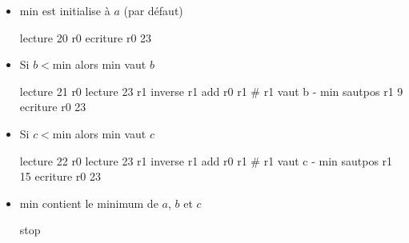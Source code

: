 \begin{enumerate}
\begin{correction}
\begin{itemize}
\begin{listing}{20}
12 # a
23 # b
6  # c
?  # min
\end{listing}
\item $\text{min}$ est initialise à $a$ (par défaut)
\begin{listing}{1}
lecture 20 r0
ecriture r0 23
\end{listing}
\item Si $b < \text{min}$ alors $\text{min}$ vaut $b$
\begin{listing}{3}
lecture 21 r0
lecture 23 r1
inverse r1
add r0 r1    # r1 vaut b - min
sautpos r1 9
ecriture r0 23
\end{listing}
\item Si $c < \text{min}$ alors $\text{min}$ vaut $c$
\begin{listing}{9}
lecture 22 r0
lecture 23 r1
inverse r1
add r0 r1 # r1 vaut c - min
sautpos r1 15
ecriture r0 23
\end{listing}
\item $\text{min}$ contient le minimum de $a$, $b$ et $c$
\begin{listing}{15}
stop
\end{listing}
\end{itemize}
\end{correction}
\end{enumerate}

